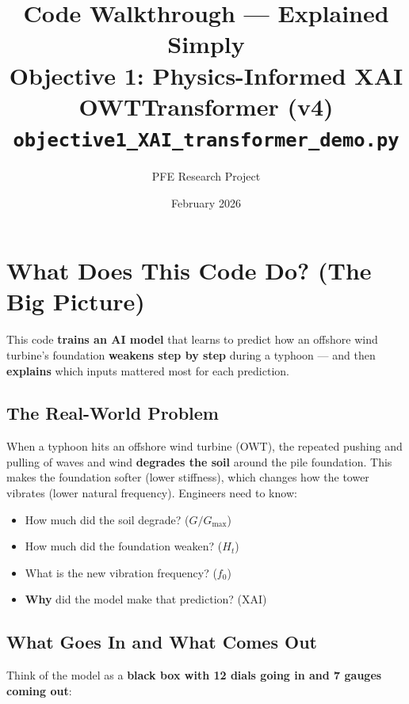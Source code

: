 \documentclass[11pt,a4paper]{article}
\title{
  \textbf{Code Walkthrough --- Explained Simply}\\[4pt]
  \Large Objective 1: Physics-Informed XAI OWTTransformer (v4)\\[2pt]
  \large \texttt{objective1\_XAI\_transformer\_demo.py}
}
\author{PFE Research Project}
\date{February 2026}
\begin{document}
\maketitle
\tableofcontents
\newpage


\section{What Does This Code Do?  (The Big Picture)}

\begin{keybox}
This code \textbf{trains an AI model} that learns to predict how an
offshore wind turbine's foundation \textbf{weakens step by step}
during a typhoon --- and then \textbf{explains} which inputs mattered
most for each prediction.
\end{keybox}

\subsection{The Real-World Problem}

When a typhoon hits an offshore wind turbine (OWT), the repeated
pushing and pulling of waves and wind \textbf{degrades the soil}
around the pile foundation.  This makes the foundation softer
(lower stiffness), which changes how the tower vibrates (lower
natural frequency).  Engineers need to know:

\begin{itemize}[nosep]
  \item How much did the soil degrade?  ($G/G_{\max}$)
  \item How much did the foundation weaken?  ($H_t$)
  \item What is the new vibration frequency?  ($f_0$)
  \item \textbf{Why} did the model make that prediction?  (XAI)
\end{itemize}

\subsection{What Goes In and What Comes Out}

Think of the model as a \textbf{black box with 12 dials going in
and 7 gauges coming out}:
\end{document}
